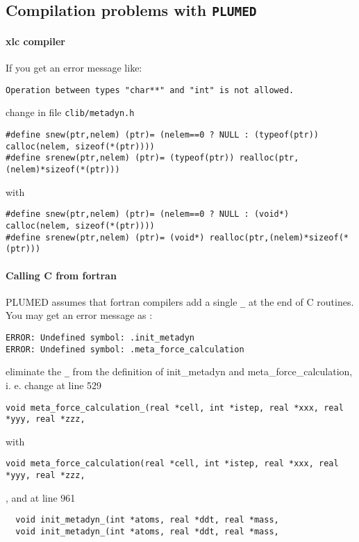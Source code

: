 \documentclass[12pt,a4paper]{article}
\begin{document}
\subsection{Compilation problems with \texttt{PLUMED}}

\paragraph{xlc compiler}
If you get an error message like:
\begin{verbatim}
Operation between types "char**" and "int" is not allowed.
\end{verbatim}
change in file \texttt{clib/metadyn.h}
\begin{verbatim}
#define snew(ptr,nelem) (ptr)= (nelem==0 ? NULL : (typeof(ptr)) calloc(nelem, sizeof(*(ptr))))
#define srenew(ptr,nelem) (ptr)= (typeof(ptr)) realloc(ptr,(nelem)*sizeof(*(ptr)))
\end{verbatim}
with
\begin{verbatim}
#define snew(ptr,nelem) (ptr)= (nelem==0 ? NULL : (void*) calloc(nelem, sizeof(*(ptr))))
#define srenew(ptr,nelem) (ptr)= (void*) realloc(ptr,(nelem)*sizeof(*(ptr)))
\end{verbatim}

\paragraph{Calling C from fortran}
PLUMED assumes that fortran compilers add a single \texttt{\_} at the end of C routines. You
may get an error message as :
\begin{verbatim}
ERROR: Undefined symbol: .init_metadyn
ERROR: Undefined symbol: .meta_force_calculation
\end{verbatim}
eliminate the \texttt{\_} from the definition of init\_metadyn and meta\_force\_calculation, i. e.
change at line 529
\begin{verbatim}
void meta_force_calculation_(real *cell, int *istep, real *xxx, real *yyy, real *zzz, 
\end{verbatim}
with
\begin{verbatim}
void meta_force_calculation(real *cell, int *istep, real *xxx, real *yyy, real *zzz,    
\end{verbatim},
and at line 961
\begin{verbatim}
  void init_metadyn_(int *atoms, real *ddt, real *mass, 
  void init_metadyn_(int *atoms, real *ddt, real *mass, 
\end{verbatim}
\end{document}
